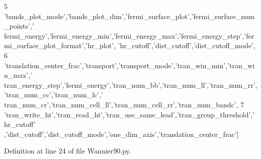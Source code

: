 \begin{DoxyCode}
5                      \textcolor{stringliteral}{'bands\_plot\_mode'},\textcolor{stringliteral}{'bands\_plot\_dim'},\textcolor{stringliteral}{'fermi\_surface\_plot'},\textcolor{stringliteral}{'fermi\_surface\_num\_points'},\textcolor{stringliteral}{'
      fermi\_energy'},\textcolor{stringliteral}{'fermi\_energy\_min'},\textcolor{stringliteral}{'fermi\_energy\_max'},\textcolor{stringliteral}{'fermi\_energy\_step'},\textcolor{stringliteral}{'fermi\_surface\_plot\_format'},\textcolor{stringliteral}{'hr\_plot'},\textcolor{stringliteral}{
      'hr\_cutoff'},\textcolor{stringliteral}{'dist\_cutoff'},\textcolor{stringliteral}{'dist\_cutoff\_mode'},
6                      \textcolor{stringliteral}{'translation\_center\_frac'},\textcolor{stringliteral}{'transport'},\textcolor{stringliteral}{'transport\_mode'},\textcolor{stringliteral}{'tran\_win\_min'},\textcolor{stringliteral}{'tran\_win\_max'},\textcolor{stringliteral}{'
      tran\_energy\_step'},\textcolor{stringliteral}{'fermi\_energy'},\textcolor{stringliteral}{'tran\_num\_bb'},\textcolor{stringliteral}{'tran\_num\_ll'},\textcolor{stringliteral}{'tran\_num\_rr'},\textcolor{stringliteral}{'tran\_num\_cc'},\textcolor{stringliteral}{'tran\_num\_lc'},\textcolor{stringliteral}{'
      tran\_num\_cr'},\textcolor{stringliteral}{'tran\_num\_cell\_ll'},\textcolor{stringliteral}{'tran\_num\_cell\_rr'},\textcolor{stringliteral}{'tran\_num\_bandc'},
7                      \textcolor{stringliteral}{'tran\_write\_ht'},\textcolor{stringliteral}{'tran\_read\_ht'},\textcolor{stringliteral}{'tran\_use\_same\_lead'},\textcolor{stringliteral}{'tran\_group\_threshold'},\textcolor{stringliteral}{'hr\_cutoff'}
      ,\textcolor{stringliteral}{'dist\_cutoff'},\textcolor{stringliteral}{'dist\_cutoff\_mode'},\textcolor{stringliteral}{'one\_dim\_axis'},\textcolor{stringliteral}{'translation\_center\_frac'}]
\end{DoxyCode}


Definition at line 24 of file Wannier90.\+py.

